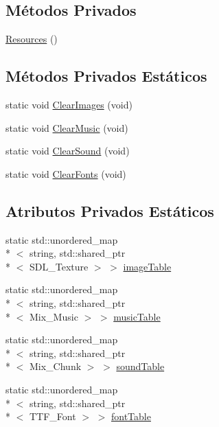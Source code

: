 \subsection*{Métodos Privados}
\begin{DoxyCompactItemize}
\item 
\hyperlink{classResources_ab09435991b8c485f92e0aa1fd00828b9}{Resources} ()
\end{DoxyCompactItemize}
\subsection*{Métodos Privados Estáticos}
\begin{DoxyCompactItemize}
\item 
static void \hyperlink{classResources_a6f83b82e64c61691b60e6aed70b6ab68}{Clear\+Images} (void)
\item 
static void \hyperlink{classResources_a37aa5ada5adf925b8862f65d207244d1}{Clear\+Music} (void)
\item 
static void \hyperlink{classResources_a07885930484a8dd953c2e144ac8be6c5}{Clear\+Sound} (void)
\item 
static void \hyperlink{classResources_abfa5ce49b74cb81a0f3c7a47d94e0eda}{Clear\+Fonts} (void)
\end{DoxyCompactItemize}
\subsection*{Atributos Privados Estáticos}
\begin{DoxyCompactItemize}
\item 
static std\+::unordered\+\_\+map\\*
$<$ string, std\+::shared\+\_\+ptr\\*
$<$ S\+D\+L\+\_\+\+Texture $>$ $>$ \hyperlink{classResources_abb18128c6fd91ee3afe41c1947c42b02}{image\+Table}
\item 
static std\+::unordered\+\_\+map\\*
$<$ string, std\+::shared\+\_\+ptr\\*
$<$ Mix\+\_\+\+Music $>$ $>$ \hyperlink{classResources_a6fa55a3d59924e7fbbcf734e01cfaa46}{music\+Table}
\item 
static std\+::unordered\+\_\+map\\*
$<$ string, std\+::shared\+\_\+ptr\\*
$<$ Mix\+\_\+\+Chunk $>$ $>$ \hyperlink{classResources_abbd116a3bc870ba6578a89b4aa08908c}{sound\+Table}
\item 
static std\+::unordered\+\_\+map\\*
$<$ string, std\+::shared\+\_\+ptr\\*
$<$ T\+T\+F\+\_\+\+Font $>$ $>$ \hyperlink{classResources_ab3665e0c725cd7f4dbf65b128f87d0d5}{font\+Table}
\end{DoxyCompactItemize}


